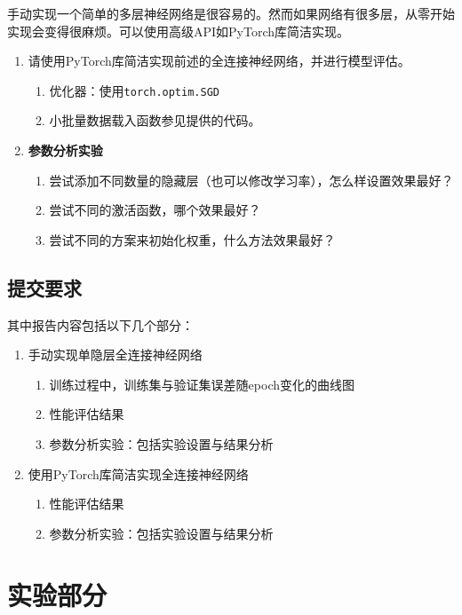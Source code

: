 \documentclass[12pt]{article}
\begin{document}
手动实现一个简单的多层神经网络是很容易的。然而如果网络有很多层，从零开始实现会变得很麻烦。可以使用高级API如PyTorch库简洁实现。


\begin{enumerate}
  \item 请使用PyTorch库简洁实现前述的全连接神经网络，并进行模型评估。
        \begin{enumerate}
          \item 优化器：使用\texttt{torch.optim.SGD}
          \item 小批量数据载入函数参见提供的代码。
        \end{enumerate}
  \item \textbf{参数分析实验}
        \begin{enumerate}
          \item 尝试添加不同数量的隐藏层（也可以修改学习率），怎么样设置效果最好？
          \item 尝试不同的激活函数，哪个效果最好？
          \item 尝试不同的方案来初始化权重，什么方法效果最好？
        \end{enumerate}
\end{enumerate}

\subsection{提交要求}
其中报告内容包括以下几个部分：
\begin{enumerate}
  \item 手动实现单隐层全连接神经网络
        \begin{enumerate}
          \item 训练过程中，训练集与验证集误差随epoch变化的曲线图
          \item 性能评估结果
          \item 参数分析实验：包括实验设置与结果分析
        \end{enumerate}
  \item 使用PyTorch库简洁实现全连接神经网络
        \begin{enumerate}
          \item 性能评估结果
          \item 参数分析实验：包括实验设置与结果分析
        \end{enumerate}
\end{enumerate}



\section{实验部分}
\end{document}
